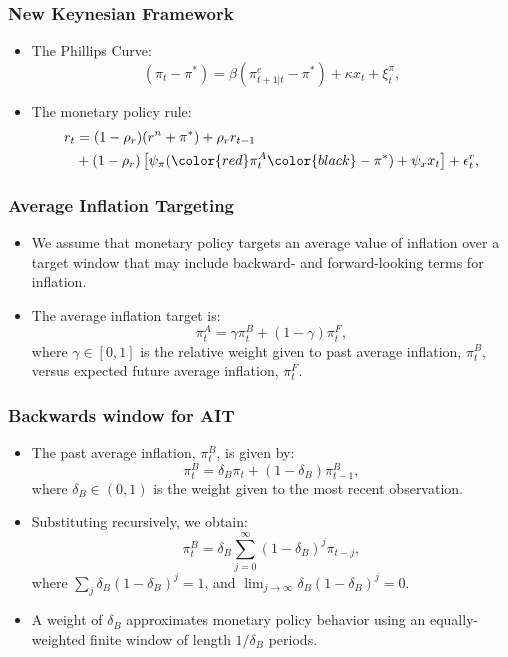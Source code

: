 \documentclass{beamer}
\begin{document}
\begin{frame}
	\frametitle{New Keynesian Framework}
	\begin{itemize}
		\item The Phillips Curve: 
		\begin{equation}\label{eq:PhillipsCurvee}
			(\pi_t - \pi^*) = \beta (\pi_{t+1|t}^e - \pi^*) + \kappa x_t + \xi_t^{\pi},
		\end{equation}
		\item The monetary policy rule:
		\begin{align}\label{eq:TaylorRule}
			r_t &= (1-\rho_r)(r^n + \pi^*) + \rho_r r_{t-1} \nonumber \\
				& + (1-\rho_r) \left[ \psi_\pi (\color{red}\pi_t^A \color{black} - \pi^*) + \psi_x x_t \right] + \epsilon_t^{r},
		\end{align}
	\end{itemize}
\end{frame}

\begin{frame}
	\frametitle{Average Inflation Targeting}
	\begin{itemize}
		\setlength{\itemsep}{1em}
		\item We assume that monetary policy targets an average value of inflation over a target window that may include backward- and forward-looking terms for inflation. 
		\item The average inflation target is:
		\begin{equation}
			\pi_t^A = \gamma \pi_t^B + (1-\gamma) \pi_t^F,
		\end{equation}
		where $\gamma \in [0,1]$ is the relative weight given to past average inflation, $\pi_t^B$, versus expected future average inflation, $\pi_t^F$.
	\end{itemize}
\end{frame}

\begin{frame}
	\frametitle{Backwards window for AIT}
	\begin{itemize}
		\setlength{\itemsep}{1em}
		\item The past average inflation, $\pi_t^B$, is given by:
		\begin{equation}\label{eq:backward}
			\pi_t^B = \delta_B \pi_t + (1-\delta_B) \pi_{t-1}^B,
		\end{equation}
		where $\delta_B \in (0,1)$ is the weight given to the most recent observation.
		\item Substituting recursively, we obtain:
		\begin{equation*}\label{eq:backward_all}
			\pi_t^B = \delta_B \sum_{j=0}^{\infty} (1-\delta_B)^j \pi_{t-j},
		\end{equation*}
		where $\sum_j \delta_B (1-\delta_B)^j=1$, and $\lim_{j \to \infty} \delta_B (1-\delta_B)^j=0$.
		\item A weight of $\delta_B$ approximates monetary policy behavior using an equally-weighted finite window of length $1 / \delta_B$ periods.
	\end{itemize}
\end{frame}
\end{document}

